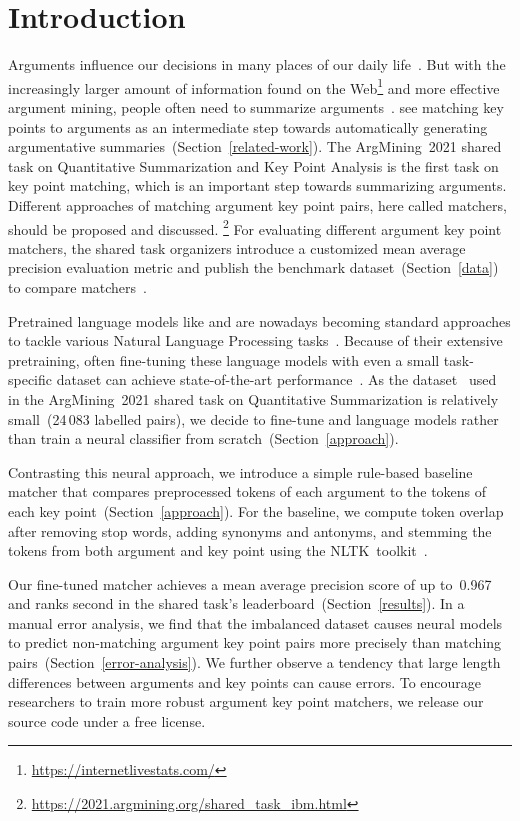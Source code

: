 \section{Introduction}\label{introduction}

Arguments influence our decisions in many places of our daily life~\cite{Bar-HaimEFKLS2020}.
But with the increasingly larger amount of information found on the Web\footnote{\url{https://internetlivestats.com/}} 
and more effective argument mining, people often need to summarize arguments~\cite{LawrenceR2019,Bar-HaimEFKLS2020}.
\citet{Bar-HaimEFKLS2020} see matching key points to arguments as an intermediate step towards automatically generating 
argumentative summaries~(Section~\ref{related-work}).
The ArgMining~2021 shared task on Quantitative Summarization and Key Point Analysis is the first task on key point matching, 
which is an important step towards summarizing arguments.
Different approaches of matching argument key point pairs, here called matchers, should be proposed and discussed.%
\footnote{\url{https://2021.argmining.org/shared_task_ibm.html}}
For evaluating different argument key point matchers, the shared task organizers introduce a customized mean average 
precision evaluation metric and publish the \ArgKP benchmark dataset~(Section~\ref{data}) to compare 
matchers~\cite{Bar-HaimEFKLS2020}. %

Pretrained language models like \Bert and \Roberta are nowadays becoming standard approaches to tackle various Natural 
Language Processing tasks~\cite{DevlinCLT2019,LiuOGDJCLLZS2019}.
Because of their extensive pretraining, often fine-tuning these language models with even a small task-specific dataset 
can achieve state-of-the-art performance~\cite{DevlinCLT2019}.
As the \ArgKP dataset~\cite{Bar-HaimEFKLS2020} used in the ArgMining~2021 shared task on Quantitative Summarization is 
relatively small~(24\,083 labelled pairs), we decide to fine-tune \Bert and \Roberta language models rather than train 
a neural classifier from scratch~(Section~\ref{approach}).

Contrasting this neural approach, we introduce a simple rule-based baseline matcher that compares preprocessed tokens of 
each argument to the tokens of each key point~(Section~\ref{approach}).
For the baseline, we compute token overlap after removing stop words, adding synonyms and antonyms, and stemming the 
tokens from both argument and key point using the NLTK~toolkit~\cite{BirdL2004}.

Our fine-tuned \RobertaBase matcher achieves a mean average precision score of up to~0.967 and ranks second in the 
shared task's leaderboard~(Section~\ref{results}).
In a manual error analysis, we find that the imbalanced \ArgKP dataset causes neural models to predict non-matching 
argument key point pairs more precisely than matching pairs~(Section~\ref{error-analysis}).
We further observe a tendency that large length differences between arguments and key points can cause errors.
To encourage researchers to train more robust argument key point matchers, we release our source code under a free license.%
